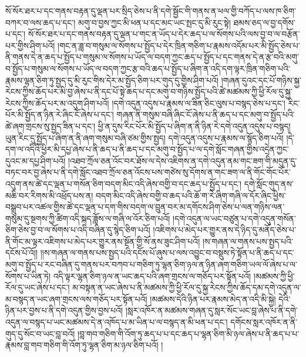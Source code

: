 སོ་སོར་ཐར་པ་དང་གནས་བརྟན་དུ་ལྡན་པར་སྲིད་ཅེས་པ་ནི་དགེ་སྦྱོང་གི་གནས་ན་ཕལ་གྱི་བཀོད་པ་ལས་ཁ་ཅིག་བཀར་བ་ལས་ཆད་པ་དང་། མགུ་བ་བྱས་ཀྱང་མི་ཕན་པ་དང་མང་ཡང་སྤང་དུ་མི་རུང་སྟེ། ཐམས་ཅད་ལ་བྱ་དགོས་པ་དང་། སོ་སོར་ཐར་པ་དང་གནས་བརྟན་དུ་ལྡན་པ་གང་ན་ཡོད་པ་དེར་ཆད་པ་ལ་སོགས་པའི་ལས་བྱ་བ་ལ་བརྩོན་པར་གྱིས་ཤིག་པའོ། །གང་ན་ཟླ་བ་གསུམ་ལ་སོགས་པ་སྤྱོད་པ་དེར་ཁྲིན་གཅིག་པ་རྣམས་འདོམ་པར་མི་སྤྱོད་ཅེས་པ་ནི་གནས་དེ་ན་ཆད་པ་སྤྱོད་པ་གསུམ་ལ་སོགས་པ་ཡོད་ལ་བདག་ཀྱང་ཆད་པ་སྤྱོད་པ་དང་གནས་དེ་ན་རྩ་བའི་མགུ་བ་སྤྱོད་པ་གསུམ་ལ་སོགས་པ་ཡོད་ལ་བདག་ཀྱང་རྩ་བའི་ཆད་པ་སྤྱོད་པ་ཞིག་ན་འདི་དག་ལྟར་ཁྲིན་གཅིག་པའི་རྣམས་ལྷན་ཅིག་ཏུ་སྤྱད་དུ་མི་རུང་གིས་དེར་མ་སྤྱོད་ཅིག་པར་གུད་དུ་གྱིས་ཤིག་པའོ། །གཞན་དུའང་དང་པོ་གཉིས་སྐྱ་རེངས་ཀྱིས་ཆོད་པར་མི་བྱ་ཞེས་པ་ནི་དང་པོ་སྟེ་ཆད་པ་དང་མགུ་བ་གཉིས་སྤྱོད་པའི་ཚེ་མཚམས་ཀྱི་ཕྱི་རོལ་དུ་སྐྱ་རེངས་ཀྱིས་ཆོད་པར་མ་འདུག་ཤིག་པའོ། །དགེ་འདུན་འདུས་པ་རྣམས་ལ་ཟིན་ཅིང་ལུས་པ་བསྙད་ཅེས་པ་དང་། རིང་པོར་མི་སྤྱོད་ན་ཉིན་རེ་ཞིང་ངོ་ཞེས་པ་དང་། གཞན་ནི་གསུམ་བཞི་ཞིང་ངོ་ཞེས་པ་ནི་ཆད་པ་དང་མགུ་བ་སྤྱོད་པའི་ཚེ་ཞག་གྲངས་སུ་སྤྱད་ཟིན་པ་དང་། ཕྱི་ན་དུས་རིང་པོར་མི་སྤྱོད་པ་ཞིག་ན་ནི་ཉིན་རེ་དགེ་འདུན་འདུས་པ་བསྙད། ཡུན་རིང་དུ་སྤྱོད་པ་ཞིག་ན་ནི་ཞག་གསུམ་བཞི་ཙམ་གྱིས་སྤྱད། དགེ་འདུན་འདུས་པ་རྣམས་ལ་སྙོད་ཅིག་པའོ། །དེ་དག་ལ་འདིའི་ཕྱིར་མི་དཔྱ་ཞེས་པ་ནི་ཆད་པ་ནི་ཆད་པ་དང་མགུ་བ་སྤྱོད་པ་ལ་དགེ་སློང་གཞན་གྱིས་འདྲེན་ཀྱང་དུའང་མ་དཔྱ་ཤིག་པའོ། །འཐབ་ཀྲོལ་ཅན་འོང་བར་ཐོས་ལ་དེས་འཇིགས་ན་དགེ་འདུན་ནམ་གང་ཟག་གི་མདུན་དུ་བཏང་བར་བྱ་ཞེས་པ་ནི་དགེ་སློང་འཐབ་ཀྲོལ་ཅན་འོངས་པས་གཙེས་སུ་དོགས་ན་གང་ཟག་ལ་ནི་གོང་གོང་པོར་འདུག་ནས་ཚེ་དང་ལྡན་པ་གསོན་ཅིག་བདག་མིང་འདི་ཞེས་བགྱི་བ་དང་ཆད་པ་སྤྱོད་པ་དང་། དགེ་སློང་གུད་ནས་མཆི་བར་རིགས་མི་འཕྲོད་པས་ན། བདག་མིང་འདི་ཞེས་བགྱི་བ་ཆད་པའི་ཆོ་ག་རེ་ཞིག་གཞི་ལ་དོར་ཞིང་ཕྱིས་བསྒྲུབ་པར་འཚལ་གྱིས་ཚེ་དང་ལྡན་པ་དག་གིས་བདག་ལ་བྲུན་བར་མ་དགོངས་ཤིག་ཅེས་པ་ལན་གཉིས་ལན་གསུམ་དུ་སྔགས་ཀྱི་ཚིག་འདི་སྐད་ཟློས་ལ་གཞི་ལ་འོར་ཅིག་པའོ། །དགེ་འདུན་ལ་ཡང་བཙུན་པ་དགེ་འདུན་གསོན་ཅིག་ཅེས་བྱ་བ་ལ་སོགས་པ་འདི་བཞིན་དུ་སྙེད་ཅིག་པའོ། །འཇིགས་པ་མེད་པར་གྱུར་ནས་དེ་ཉིད་དུ་མནོད་ཅེས་པ་ནི་གོང་མ་ལྟར་འཇིགས་པ་མེད་པར་གྱུར་ནས་སྔོན་གྱི་སོ་ནས་ཟུང་ཤིག་པའོ། །ས་གཞན་ལ་གནས་པས་སྤྱད་པའི་དངོས་པོ་འོ།། །།ས་གཞན་ལ་གནས་པས་སྤྱད་པའི་དངོས་པོ་ཞུས་པ་ལས་འབྱུང་བ་བསྡུས་ཏེ་སྟོན་པ་ནི་ཆད་པ་དང་མགུ་བ་སྤྱོད་པ་རང་བཞིན་དུ་གནས་པར་བཀབ་པ་གཅིག་ཏུ་ལྷན་ཅིག་ཉལ་ན་ཉིན་ཞག་གཅིག་ཡལ་ལོ་ཞེས་པ་ལ་སོགས་པ་ཡིན་ཏེ། འདི་ལྟར་ལྷན་ཅིག་ཉལ་ན་ཡང་ཆད་པའི་ཞག་གྲངས་ལ་གཅོད་པར་སྟོན་པའོ། །མཚམས་ཀྱི་ཕྱི་རོལ་དུ་ཡང་ཞེས་པ་དང་། མ་བསྟན་ན་ཡང་ཞེས་པ་ནི་མཚམས་ཀྱི་ཕྱི་རོལ་དུ་སྐྱ་རེངས་ཀྱིས་ཆོད་དམ་དགེ་འདུན་ལ་མ་བསྙད་ན་ཡང་ཞག་གྲངས་ལས་གཅོད་པར་སྟོན་པའོ། །མཚམས་དེའི་ཉིན་པར་རྣམས་མེད་ན་འདི་མི་སྐྱེ། དེའི་ཉིན་པར་བྱས་པ་ནི་དགེ་འདུན་གྱིས་བྱས་པའོ། །སླར་འཁོར་ན་མཚམས་གཞན་དུ་སླར་སོང་ཡང་བླ་ཞེས་པ་ནི་དགེ་འདུན་ལ་བསྙད་པ་ཡང་མཚམས་དེ་ན་འཁོད་པ་མ་ཡིན་པ་ལ་བསྙད་ན་མི་ཕན་པ་དང་། དགོངས་སླར་འཁོར་ན་ནི་གུད་དུ་སོང་བ་ཡང་བླ་བའོ། །བླ་གབ་གཅིག་གི་འོག་ཏུ་ཆད་པ་པ་དང་ཆད་པ་ལྷན་ཅིག་མི་ཉལ་ཞེས་པ་ནི་ཆད་པ་པ་རྣམས་བླ་གབ་གཅིག་གི་འོག་ཏུ་ལྷན་ཅིག་མ་ཉལ་ཅིག་པའོ། །

